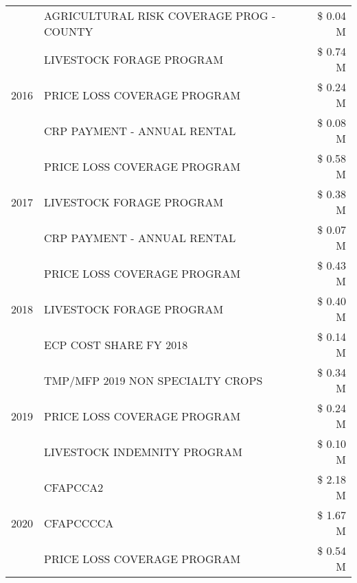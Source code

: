 \begin{tabular}{llr}
 & AGRICULTURAL RISK COVERAGE PROG - COUNTY & \$ 0.04 M \\
\cline{1-3}
\multirow[t]{3}{*}{2016} & LIVESTOCK FORAGE PROGRAM & \$ 0.74 M \\
 & PRICE LOSS COVERAGE PROGRAM & \$ 0.24 M \\
 & CRP PAYMENT - ANNUAL RENTAL & \$ 0.08 M \\
\cline{1-3}
\multirow[t]{3}{*}{2017} & PRICE LOSS COVERAGE PROGRAM & \$ 0.58 M \\
 & LIVESTOCK FORAGE PROGRAM & \$ 0.38 M \\
 & CRP PAYMENT - ANNUAL RENTAL & \$ 0.07 M \\
\cline{1-3}
\multirow[t]{3}{*}{2018} & PRICE LOSS COVERAGE PROGRAM & \$ 0.43 M \\
 & LIVESTOCK FORAGE PROGRAM & \$ 0.40 M \\
 & ECP COST SHARE FY 2018 & \$ 0.14 M \\
\cline{1-3}
\multirow[t]{3}{*}{2019} & TMP/MFP 2019 NON SPECIALTY CROPS & \$ 0.34 M \\
 & PRICE LOSS COVERAGE PROGRAM & \$ 0.24 M \\
 & LIVESTOCK INDEMNITY PROGRAM & \$ 0.10 M \\
\cline{1-3}
\multirow[t]{3}{*}{2020} & CFAPCCA2 & \$ 2.18 M \\
 & CFAPCCCCA & \$ 1.67 M \\
 & PRICE LOSS COVERAGE PROGRAM & \$ 0.54 M \\
\cline{1-3}
\bottomrule
\end{tabular}
